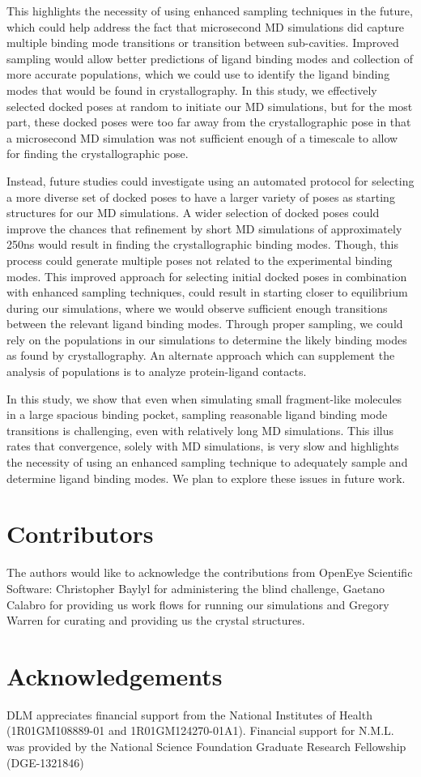 This highlights the necessity of using enhanced sampling techniques in the future, which could help address the fact that microsecond MD simulations did capture multiple binding mode transitions or transition between sub-cavities.
Improved sampling would allow better predictions of ligand binding modes and collection of more accurate populations, which we could use to identify the ligand binding modes that would be found in crystallography.
In this study, we effectively selected docked poses at random to initiate our MD simulations, but for the most part, these docked poses were too far away from the crystallographic pose in that a microsecond MD simulation was not sufficient enough of a timescale to allow for finding the crystallographic pose.

Instead, future studies could investigate using an automated protocol for selecting a more diverse set of docked poses to have a larger variety of poses as starting structures for our MD simulations.
A wider selection of docked poses could improve the chances that refinement by short MD simulations of approximately 250ns would result in finding the crystallographic binding modes. 
Though, this process could generate multiple poses not related to the experimental binding modes.
This improved approach for selecting initial docked poses in combination with enhanced sampling techniques, could result in starting closer to equilibrium during our simulations, where we would observe sufficient enough transitions between the relevant ligand binding modes.
Through proper sampling, we could rely on the populations in our simulations to determine the likely binding modes as found by crystallography.
An alternate approach which can supplement the analysis of populations is to analyze protein-ligand contacts.

In this study, we show that even when simulating small fragment-like molecules in a large spacious binding pocket, sampling reasonable ligand binding mode transitions is challenging, even with relatively long MD simulations.
This illus rates that convergence, solely with MD simulations, is very slow and highlights the necessity of using an enhanced sampling technique to adequately sample and determine ligand binding modes.
We plan to explore these issues in future work.

\section{Contributors}
The authors would like to acknowledge the contributions from OpenEye Scientific Software: Christopher Baylyl for administering the blind challenge, Gaetano Calabro for providing us work flows for running our simulations and Gregory Warren for curating and providing us the crystal structures.

\section{Acknowledgements}
DLM appreciates financial support from the National Institutes of Health (1R01GM108889-01 and 1R01GM124270-01A1). Financial support for N.M.L. was provided by the National Science Foundation Graduate Research Fellowship (DGE-1321846)

